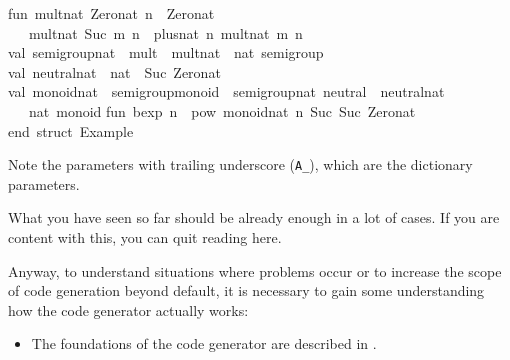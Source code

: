 \begin{isabellebody}
\begin{isamarkuptext}
\isanewline
fun\ mult{\isacharunderscore}nat\ Zero{\isacharunderscore}nat\ n\ {\isacharequal}\ Zero{\isacharunderscore}nat\isanewline
\ \ {\isacharbar}\ mult{\isacharunderscore}nat\ {\isacharparenleft}Suc\ m{\isacharparenright}\ n\ {\isacharequal}\ plus{\isacharunderscore}nat\ n\ {\isacharparenleft}mult{\isacharunderscore}nat\ m\ n{\isacharparenright}{\isacharsemicolon}\isanewline
\isanewline
val\ semigroup{\isacharunderscore}nat\ {\isacharequal}\ {\isacharbraceleft}mult\ {\isacharequal}\ mult{\isacharunderscore}nat{\isacharbraceright}\ {\isacharcolon}\ nat\ semigroup{\isacharsemicolon}\isanewline
\isanewline
val\ neutral{\isacharunderscore}nat\ {\isacharcolon}\ nat\ {\isacharequal}\ Suc\ Zero{\isacharunderscore}nat{\isacharsemicolon}\isanewline
\isanewline
val\ monoid{\isacharunderscore}nat\ {\isacharequal}\ {\isacharbraceleft}semigroup{\isacharunderscore}monoid\ {\isacharequal}\ semigroup{\isacharunderscore}nat{\isacharcomma}\ neutral\ {\isacharequal}\ neutral{\isacharunderscore}nat{\isacharbraceright}\isanewline
\ \ {\isacharcolon}\ nat\ monoid{\isacharsemicolon}\isanewline
\isanewline
fun\ bexp\ n\ {\isacharequal}\ pow\ monoid{\isacharunderscore}nat\ n\ {\isacharparenleft}Suc\ {\isacharparenleft}Suc\ Zero{\isacharunderscore}nat{\isacharparenright}{\isacharparenright}{\isacharsemicolon}\isanewline
\isanewline
end{\isacharsemicolon}\ {\isacharparenleft}{\isacharasterisk}struct\ Example{\isacharasterisk}{\isacharparenright}\isanewline%
\end{isamarkuptext}%
\isamarkuptrue%
%
\endisatagtypewriter
{\isafoldtypewriter}%
%
\isadelimtypewriter
%
\endisadelimtypewriter
%
\begin{isamarkuptext}%
\noindent Note the parameters with trailing underscore (\verb|A_|), which are the dictionary parameters.%
\end{isamarkuptext}%
\isamarkuptrue%
%
\isamarkuptrue%
%
\begin{isamarkuptext}%
What you have seen so far should be already enough in a lot of
  cases.  If you are content with this, you can quit reading here.

  Anyway, to understand situations where problems occur or to increase
  the scope of code generation beyond default, it is necessary to gain
  some understanding how the code generator actually works:

  \begin{itemize}

    \item The foundations of the code generator are described in
      .


\end{itemize}
\end{isamarkuptext}
\end{isabellebody}
